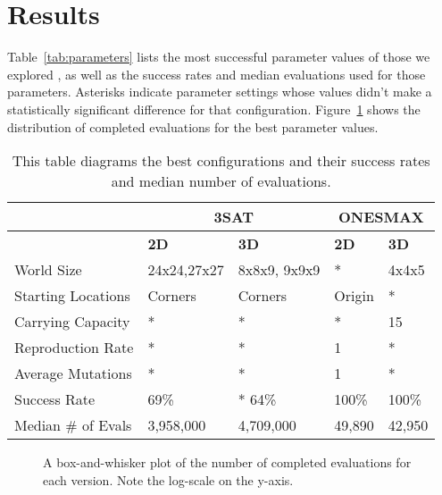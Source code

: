 \documentclass[12pt]{article}
\begin{document}

\section{Results} \label{sec:results}

Table~\ref{tab:parameters} lists the most successful parameter values of those we explored , as well as the success rates and median evaluations used for those parameters. Asterisks indicate parameter settings whose values didn't make a statistically significant difference for that configuration. Figure~\ref{fig:evalPlots} shows the distribution of completed evaluations for the best parameter values.

\begin{table}[tb]
\begin{center}
\begin{tabular}{|l||l|l||l|l|}
	\hline
	& \multicolumn{2}{|c||}{3SAT} & \multicolumn{2}{|c|}{ONESMAX} \\
	\hline
	& \textbf{2D} & \textbf{3D} & \textbf{2D} & \textbf{3D} \\ \hline
	World Size & 24x24,27x27 & 8x8x9, 9x9x9 & * & 4x4x5 \\
	Starting Locations & Corners & Corners & Origin & * \\
	Carrying Capacity & * & * &	* & 15 \\
	Reproduction Rate & * & * & 1 & * \\
	Average Mutations & * & * & 1 & * \\
	Success Rate &	69\% & * 64\% & 100\% & 100\% \\
	Median \# of Evals & 3,958,000 & 4,709,000 & 49,890 & 42,950 \\
	\hline
\end{tabular}
\caption{This table diagrams the best configurations and their success rates and median number of evaluations.}
\label{tab:results}
\end{center}
\end{table}

\begin{figure}[tb]

 \centering
 \caption{A box-and-whisker plot of the number of completed evaluations for each version. Note the log-scale on the y-axis.}
 \label{fig:evalPlots}

\end{figure}
\end{document}
